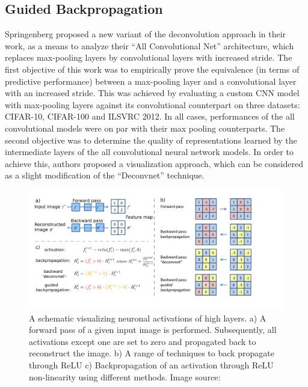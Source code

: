 \documentclass[../report.tex]{subfiles}
\begin{document}
 \subsection{Guided Backpropagation}
 Springenberg \etal \cite{guided_backprop} proposed a new variant of the deconvolution approach in their work, as a means to analyze their \enquote{All Convolutional Net} architecture, which replaces max-pooling layers by convolutional layers with increased stride. The first objective of this work was to empirically prove the equivalence (in terms of predictive performance) between a max-pooling layer and a convolutional layer with an increased stride. This was achieved by evaluating a custom CNN model with max-pooling layers against its convolutional counterpart on three datasets: CIFAR-10, CIFAR-100 and ILSVRC 2012. In all cases, performances of the all convolutional models were on par with their max pooling counterparts. The second objective was to determine the quality of representations learned by the intermediate layers of the all convolutional neural network models. In order to achieve this, authors proposed a visualization  approach, which can be considered as a slight modification of the \enquote{Deconvnet} \cite{matthew2014visualizing} technique.
  \begin{figure}[H]
 	\centering
 	\includegraphics[scale=0.25]{images/chapter3/guided_backprop.png}
 	\caption[A schematic visualizing neuronal activations of high layers.] {A schematic visualizing neuronal activations of high layers. a) A forward pass of a given input image is performed. Subsequently, all activations except one are set to zero and propagated back to reconstruct the image. b) A range of techniques to back propagate through ReLU c) Backpropagation of an activation through ReLU non-linearity using different methods. Image source: \cite{guided_backprop}}
 	\label{fig_guided_backprop}
 \end{figure}
 
\end{document}
